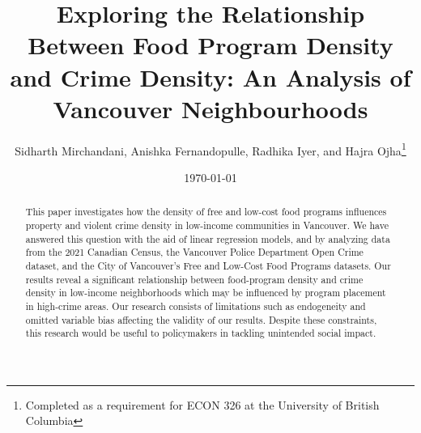 \documentclass[AEJ]{AEA}
\begin{document}
\title{Exploring the Relationship Between Food Program Density and Crime Density: An Analysis of Vancouver Neighbourhoods}
\author{Sidharth Mirchandani, Anishka Fernandopulle, Radhika Iyer, and Hajra Ojha\thanks{%
Completed as a requirement for ECON 326 at the University of British Columbia}}
\date{\today}
\JEL{}
\Keywords{}

\begin{abstract}
This paper investigates how the density of free and low-cost food programs influences property and violent crime density in low-income communities in Vancouver. We have answered this question with the aid of linear regression models, and by analyzing data from the 2021 Canadian Census, the Vancouver Police Department Open Crime dataset, and the City of Vancouver's Free and Low-Cost Food Programs datasets. Our results reveal a significant relationship between food-program density and crime density in low-income neighborhoods which may be influenced by program placement in high-crime areas. Our research consists of limitations such as endogeneity and omitted variable bias affecting the validity of our results. Despite these constraints, this research would be useful to policymakers in tackling unintended social impact.
\end{abstract}

\maketitle






\end{document}
